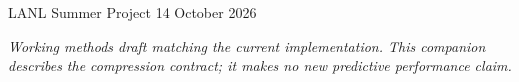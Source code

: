 \documentclass[10pt]{article}
\begin{document}
\par
\smallskip
\noindent LANL Summer Project \hfill 14 October 2026\par
\medskip
\noindent\textit{Working methods draft matching the current implementation.
This companion describes the compression contract; it makes no new predictive
performance claim.}

\end{document}
